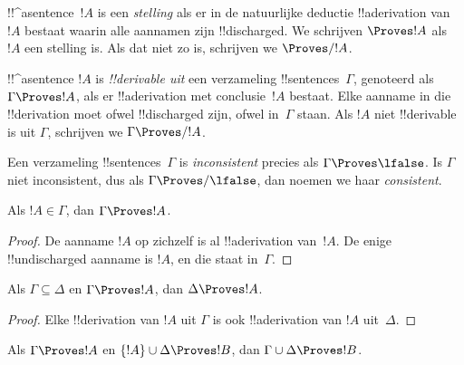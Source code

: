 \documentclass[openany]{memoir}
\begin{document}
\begin{defn}[Stellingen]
!!^a{sentence}~$!A$ is een \emph{stelling} als er in de natuurlijke
deductie !!a{derivation} van~$!A$ bestaat waarin alle aannamen zijn
!!{discharged}. We schrijven $\Proves !A$ als $!A$ een stelling is.
Als dat niet zo is, schrijven we $\Proves/ !A$.
\end{defn}

\begin{defn}[!!^{derivability}]
!!^a{sentence} $!A$ is \emph{!!{derivable} uit} een verzameling
!!{sentence}s~$\Gamma$, genoteerd als $\Gamma \Proves !A$, als er
!!a{derivation} met conclusie~$!A$ bestaat. Elke aanname in die
!!{derivation} moet ofwel !!{discharged} zijn, ofwel in~$\Gamma$
staan. Als $!A$ niet !!{derivable} is uit $\Gamma$, schrijven we
$\Gamma \Proves/ !A$.
\end{defn}

\begin{defn}[Consistentie]
Een verzameling !!{sentence}s~$\Gamma$ is \emph{inconsistent} precies
als $\Gamma \Proves \lfalse$. Is $\Gamma$ niet inconsistent, dus als
$\Gamma \Proves/ \lfalse$, dan noemen we haar \emph{consistent}.
\end{defn}

\begin{prop}[Reflexiviteit]
Als $!A \in \Gamma$, dan $\Gamma \Proves !A$.
\end{prop}

\begin{proof}
De aanname $!A$ op zichzelf is al !!a{derivation} van~$!A$. De enige
!!{undischarged} aanname is $!A$, en die staat in~$\Gamma$.
\end{proof}
  

\begin{prop}[Monotonie]
Als $\Gamma \subseteq \Delta$ en $\Gamma \Proves !A$, dan $\Delta
\Proves !A$.
\end{prop}

\begin{proof}
Elke !!{derivation} van $!A$ uit $\Gamma$ is ook !!a{derivation} van
$!A$ uit~$\Delta$.
\end{proof}

\begin{prop}[Transitiviteit]
Als $\Gamma \Proves !A$ en $\{!A\} \cup \Delta \Proves
!B$, dan $\Gamma \cup \Delta \Proves !B$.
\end{prop}
\end{document}

